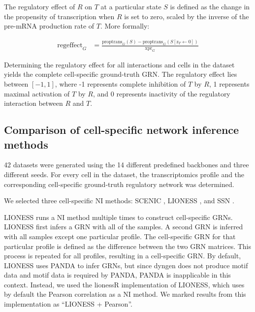\documentclass[10pt, a4paper]{article}
\begin{document}
The regulatory effect of \(R\) on \(T\) at a particular state \(S\) is
defined as the change in the propensity of transcription when \(R\) is
set to zero, scaled by the inverse of the pre-mRNA production rate of
\(T\). More formally:

\begin{eqnarray}
	\text{regeffect}_G & = \frac{\text{proptrans}_G(S) - \text{proptrans}_G(S[\text{z}_{T} \leftarrow 0])}{\text{xpr}_{G}}
\end{eqnarray}

Determining the regulatory effect for all interactions and cells in the
dataset yields the complete cell-specific ground-truth GRN. The
regulatory effect lies between \([-1, 1]\), where -1 represents complete
inhibition of \(T\) by \(R\), 1 represents maximal activation of \(T\)
by \(R\), and 0 represents inactivity of the regulatory interaction
between \(R\) and \(T\).

\hypertarget{sec:dyngen-nicompare}{%
	\subsection*{Comparison of cell-specific network inference
		methods}\label{sec:dyngen-nicompare}}

42 datasets were generated using the 14 different predefined backbones
and three different seeds. For every cell in the dataset, the
transcriptomics profile and the corresponding cell-specific ground-truth
regulatory network was determined.

We selected three cell-specific NI methods: SCENIC
\cite{aibar_scenicsinglecellregulatory_2017}, LIONESS
\cite{kuijjer_estimatingsamplespecificregulatory_2015,kuijjer_estimatingsamplespecificregulatory_2019},
and SSN \cite{liu_personalizedcharacterizationdiseases_2016}.

LIONESS \cite{kuijjer_estimatingsamplespecificregulatory_2019} runs
a NI method multiple times to construct cell-specific GRNs. LIONESS
first infers a GRN with all of the samples. A second GRN is inferred
with all samples except one particular profile. The cell-specific GRN
for that particular profile is defined as the difference between the two
GRN matrices. This process is repeated for all profiles, resulting in a
cell-specific GRN. By default, LIONESS uses PANDA
\cite{glass_passingmessagesbiological_2013} to infer GRNs, but since
dyngen does not produce motif data and motif data is required by PANDA,
PANDA is inapplicable in this context. Instead, we used the lionessR
\cite{kuijjer_lionessrsinglesample_2019} implementation of LIONESS,
which uses by default the Pearson correlation as a NI method. We marked
results from this implementation as ``LIONESS + Pearson''.
\end{document}
